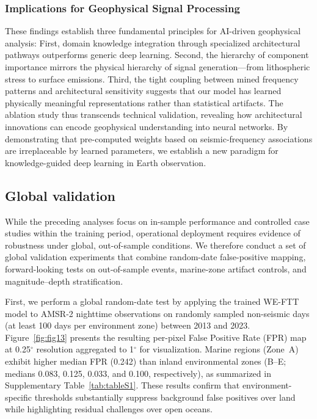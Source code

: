 \documentclass[preprint,review,12pt,authoryear]{elsarticle}
\begin{document}
\subsubsection{Implications for Geophysical Signal Processing} 
These findings establish three fundamental principles for AI-driven geophysical analysis: First, domain knowledge integration through specialized architectural pathways outperforms generic deep learning. Second, the hierarchy of component importance mirrors the physical hierarchy of signal generation---from lithospheric stress to surface emissions. Third, the tight coupling between mined frequency patterns and architectural sensitivity suggests that our model has learned physically meaningful representations rather than statistical artifacts.
The ablation study thus transcends technical validation, revealing how architectural innovations can encode geophysical understanding into neural networks. By demonstrating that pre-computed weights based on seismic-frequency associations are irreplaceable by learned parameters, we establish a new paradigm for knowledge-guided deep learning in Earth observation.

\subsection{Global validation}
While the preceding analyses focus on in-sample performance and controlled case studies within the training period, operational deployment requires evidence of robustness under global, out-of-sample conditions. We therefore conduct a set of global validation experiments that combine random-date false-positive mapping, forward-looking tests on out-of-sample events, marine-zone artifact controls, and magnitude--depth stratification.

First, we perform a global random-date test by applying the trained WE-FTT model to AMSR-2 nighttime observations on randomly sampled non-seismic days (at least 100 days per environment zone) between 2013 and 2023. Figure~\ref{fig:fig13} presents the resulting per-pixel False Positive Rate (FPR) map at 0.25$^{\circ}$ resolution aggregated to 1$^{\circ}$ for visualization. Marine regions (Zone~A) exhibit higher median FPR (0.242) than inland environmental zones (B--E; medians 0.083, 0.125, 0.033, and 0.100, respectively), as summarized in Supplementary Table~\ref{tab:tableS1}. These results confirm that environment-specific thresholds substantially suppress background false positives over land while highlighting residual challenges over open oceans.
\end{document}
